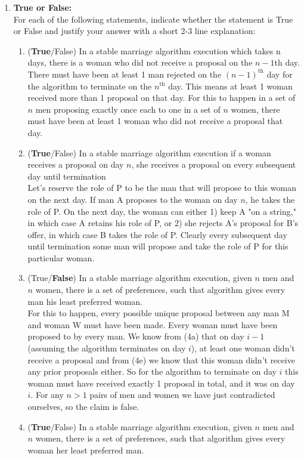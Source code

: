 \documentclass[11pt,fleqn]{article}
\begin{document}
\begin{enumerate}
\newpage
\item {\bf True or False:}\\
For each of the following statements, indicate whether the statement is True or False and justify your answer with a short 2-3 line explanation:
\begin{enumerate}
\item ({\bf True}/False) In a stable marriage algorithm execution which takes n days, there is a woman who did not receive a proposal on the $n-1$th day. \\
There must have been at least 1 man rejected on the $(n-1)^\text{th}$ day for the algorithm to terminate on the $n^\text{th}$ day. This means at least 1 woman received more than 1 proposal on that day. For this to happen in a set of $n$ men proposing exactly once each to one in a set of $n$ women, there must have been at least 1 woman who did not receive a proposal that day.
\item ({\bf True}/False) In a stable marriage algorithm execution if a woman receives a proposal on day $n$, she receives a proposal on every subsequent day until termination \\
Let's reserve the role of P to be the man that will propose to this woman on the next day. If man A proposes to the woman on day $n$, he takes the role of P. On the next day, the woman can either 1) keep A "on a string," in which case A retains his role of P, or 2) she rejects A's proposal for B's offer, in which case B takes the role of P. Clearly every subsequent day until termination some man will propose and take the role of P for this particular woman.
\item (True/{\bf False}) In a stable marriage algorithm execution, given $n$ men and $n$ women, there is a set of preferences, such that algorithm gives every man his least preferred woman. \\
For this to happen, every possible unique proposal between any man M and woman W must have been made. Every woman must have been proposed to by every man. We know from (4a) that on day $i-1$ (assuming the algorithm terminates on day $i$), at least one woman didn't receive a proposal and from (4e) we know that this woman didn't receive any prior proposals either. So for the algorithm to terminate on day $i$ this woman must have received exactly 1 proposal in total, and it was on day $i$. For any $n > 1$ pairs of men and women we have just contradicted ourselves, so the claim is false.
\item ({\bf True}/False) In a stable marriage algorithm execution, given $n$ men and $n$ women, there is a set of preferences, such that algorithm gives every woman her least preferred man. \\

\end{enumerate}
\end{enumerate}
\end{document}
